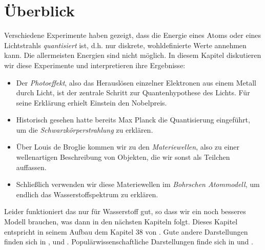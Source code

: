 



\section{Überblick}

Verschiedene Experimente haben gezeigt, dass die Energie eines Atoms oder eines Lichtstrahls \emph{quantisiert} ist, d.h. nur diskrete, wohldefinierte Werte annehmen kann. Die allermeisten Energien sind nicht möglich. In diesem Kapitel diskutieren wir diese Experimente und interpretieren ihre Ergebnisse:
\begin{itemize}
    \item Der \emph{Photoeffekt}, also das Herauslösen einzelner Elektronen aus einem Metall durch Licht, ist der zentrale Schritt zur Quantenhypothese des Lichts. Für seine Erklärung erhielt Einstein den Nobelpreis.
    \item Historisch gesehen hatte bereits Max Planck die Quantisierung eingeführt, um die \emph{Schwarzkörperstrahlung} zu erklären.
    \item Über Louis de Broglie kommen wir zu den \emph{Materiewellen}, also zu einer wellenartigen Beschreibung von Objekten, die wir sonst als Teilchen auffassen.
    \item Schließlich verwenden wir diese Materiewellen im \emph{Bohrschen Atommodell}, um endlich das Wasserstoffspektrum zu erklären.
\end{itemize}
Leider funktioniert das nur für Wasserstoff gut, so dass wir ein noch besseres Modell brauchen, was dann in den nächsten Kapiteln folgt.
Dieses Kapitel entspricht in seinem Aufbau dem Kapitel 38 von \cite{Knight_physics}. Gute andere Darstellungen finden sich in \cite{Haliday_Resnick}, \cite{Demtröder_ep3} und \cite{Haken_wolf_I}. Populärwissenschaftliche Darstellungen finde sich in \cite{QM100}
und \cite{QM_einstein}.


